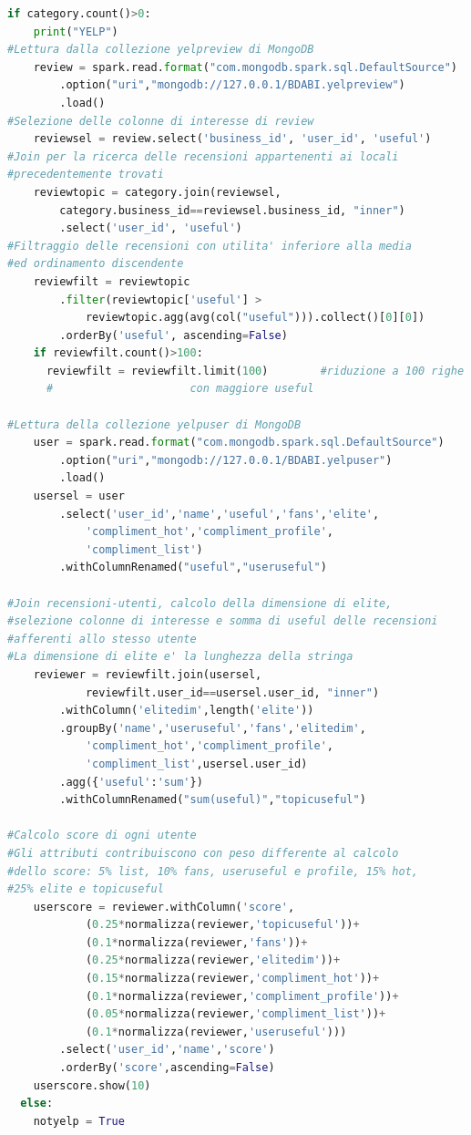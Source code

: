 \begin{lstlisting}[language=Python, caption={Expert Finding}, captionpos=b]
  if category.count()>0:
    print("YELP")
#Lettura dalla collezione yelpreview di MongoDB
    review = spark.read.format("com.mongodb.spark.sql.DefaultSource")
    	.option("uri","mongodb://127.0.0.1/BDABI.yelpreview")
    	.load()
#Selezione delle colonne di interesse di review
    reviewsel = review.select('business_id', 'user_id', 'useful')
#Join per la ricerca delle recensioni appartenenti ai locali 
#precedentemente trovati
    reviewtopic = category.join(reviewsel,
    	category.business_id==reviewsel.business_id, "inner")
    	.select('user_id', 'useful')
#Filtraggio delle recensioni con utilita' inferiore alla media 
#ed ordinamento discendente
    reviewfilt = reviewtopic
    	.filter(reviewtopic['useful'] > 
    		reviewtopic.agg(avg(col("useful"))).collect()[0][0])
    	.orderBy('useful', ascending=False)
    if reviewfilt.count()>100:
      reviewfilt = reviewfilt.limit(100)        #riduzione a 100 righe 
      #						con maggiore useful

#Lettura della collezione yelpuser di MongoDB
    user = spark.read.format("com.mongodb.spark.sql.DefaultSource")
    	.option("uri","mongodb://127.0.0.1/BDABI.yelpuser")
    	.load()
    usersel = user
    	.select('user_id','name','useful','fans','elite',
    		'compliment_hot','compliment_profile',
    		'compliment_list')
    	.withColumnRenamed("useful","useruseful")

#Join recensioni-utenti, calcolo della dimensione di elite, 
#selezione colonne di interesse e somma di useful delle recensioni 
#afferenti allo stesso utente
#La dimensione di elite e' la lunghezza della stringa
    reviewer = reviewfilt.join(usersel, 
    		reviewfilt.user_id==usersel.user_id, "inner")
    	.withColumn('elitedim',length('elite'))
    	.groupBy('name','useruseful','fans','elitedim',
    		'compliment_hot','compliment_profile',
    		'compliment_list',usersel.user_id)
    	.agg({'useful':'sum'})
    	.withColumnRenamed("sum(useful)","topicuseful")

#Calcolo score di ogni utente
#Gli attributi contribuiscono con peso differente al calcolo 
#dello score: 5% list, 10% fans, useruseful e profile, 15% hot, 
#25% elite e topicuseful
    userscore = reviewer.withColumn('score', 
	    	(0.25*normalizza(reviewer,'topicuseful'))+
	    	(0.1*normalizza(reviewer,'fans'))+
	    	(0.25*normalizza(reviewer,'elitedim'))+
	    	(0.15*normalizza(reviewer,'compliment_hot'))+
	    	(0.1*normalizza(reviewer,'compliment_profile'))+
	    	(0.05*normalizza(reviewer,'compliment_list'))+
	    	(0.1*normalizza(reviewer,'useruseful')))
    	.select('user_id','name','score')
    	.orderBy('score',ascending=False)
    userscore.show(10)
  else:
    notyelp = True


\end{lstlisting}
